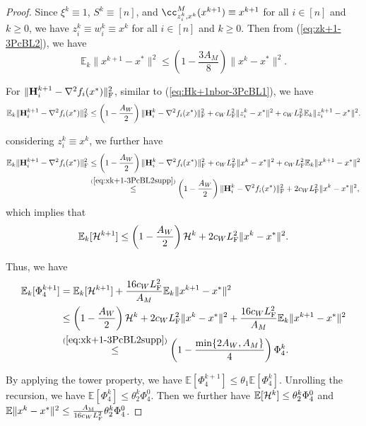 \documentclass[11pt]{article}
\begin{document}
	
	\begin{proof}
		
		Since $\xi^k\equiv 1$, $S^k \equiv [n]$, and $\cc^M_{z_i^k, x^k}(x^{k+1}) \equiv x^{k+1}$ for all $i\in [n]$ and $k\geq 0$, we have $z_i^k \equiv w_i^k \equiv x^k$ for all $i\in [n]$ and $k\geq 0$. Then from (\ref{eq:zk+1-3PcBL2}), we have 
		\begin{equation}\label{eq:xk+1-3PcBL2supp}
			\mathbb{E}_k\|x^{k+1}-x^*\|^2 \leq \left(  1 - \frac{3A_M}{8}  \right) \|x^k-x^*\|^2. 
		\end{equation}
		
		
		For $\|\mathbf{H}_i^{k+1} - \nabla^2 f_i(x^*)\|_{\rm F}^2$, similar to (\ref{eq:Hk+1nbor-3PcBL1}), we have 
		$$
		\mathbb{E}_k \|\mathbf{H}_i^{k+1} - \nabla^2 f_i(x^*)\|_{\rm F}^2 \leq \left(  1 - \frac{A_W}{2}  \right) \|\mathbf{H}_i^k - \nabla^2 f_i(x^*)\|_{\rm F}^2 + c_W L_{\rm F}^2 \|z_i^k-x^*\|^2 + c_W L_{\rm F}^2 \mathbb{E}_k\|z_i^{k+1}-x^*\|^2. 
		$$
		
		considering $z_i^k \equiv x^k$, we further have 
		\begin{align*}
			\mathbb{E}_k \|\mathbf{H}_i^{k+1} - \nabla^2 f_i(x^*)\|_{\rm F}^2 & \leq \left(  1 - \frac{A_W}{2}  \right) \|\mathbf{H}_i^k - \nabla^2 f_i(x^*)\|_{\rm F}^2 + c_W L_{\rm F}^2 \|x^k-x^*\|^2 + c_W L_{\rm F}^2 \mathbb{E}_k\|x^{k+1}-x^*\|^2 \\ 
			& \overset{(\ref{eq:xk+1-3PcBL2supp})}{\leq} \left(  1 - \frac{A_W}{2}  \right) \|\mathbf{H}_i^k - \nabla^2 f_i(x^*)\|_{\rm F}^2 + 2 c_W L_{\rm F}^2 \|x^k-x^*\|^2, 
		\end{align*}
		which implies that 
		\begin{equation}\label{eq:Gk+1-3PcBL2}
			\mathbb{E}_k [{\cal H}^{k+1}] \leq \left(  1 - \frac{A_W}{2}  \right) {\cal H}^k + 2c_WL_{\rm F}^2 \|x^k-x^*\|^2. 
		\end{equation}
		
		
		Thus, we have 
		\begin{align*}
			\mathbb{E}_k[\Phi_4^{k+1}] & = \mathbb{E}_k [{\cal H}^{k+1}] + \frac{16c_WL_{\rm F}^2}{A_M} \mathbb{E}_k\|x^{k+1}-x^*\|^2 \\ 
			& \leq \left(  1 - \frac{A_W}{2}  \right) {\cal H}^k + 2c_WL_{\rm F}^2 \|x^k-x^*\|^2 + \frac{16c_WL_{\rm F}^2}{A_M} \mathbb{E}_k\|x^{k+1}-x^*\|^2 \\ 
			& \overset{(\ref{eq:xk+1-3PcBL2supp})}{\leq} \left(  1 - \frac{\min\{  2A_W, A_M  \}}{4}  \right) \Phi_4^k. 
		\end{align*}
		
		By applying the tower property, we have $\mathbb{E}[\Phi_4^{k+1}] \leq \theta_1 \mathbb{E}[\Phi_4^k]$. Unrolling the recursion, we have $\mathbb{E}[\Phi_4^k] \leq \theta_2^k \Phi_4^0$. Then we further have $\mathbb{E}[{\cal H}^k] \leq \theta_2^k \Phi_4^0$ and $\mathbb{E}\|x^k-x^*\|^2 \leq \frac{A_{\rm M}}{16c_WL_{\rm F}^2} \theta_2^k \Phi_4^0$.
		

\end{proof}
\end{document}

